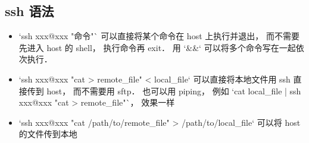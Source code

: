 \subsection{ssh 语法}
\begin{itemize}
\item `ssh xxx@xxx "命令"` 可以直接将某个命令在 host 上执行并退出， 而不需要先进入 host 的 shell， 执行命令再 exit． 用 `&&` 可以将多个命令写在一起依次执行．
\item `ssh xxx@xxx "cat > remote_file" < local_file` 可以直接将本地文件用 ssh 直接传到 host， 而不需要用 sftp． 也可以用 piping， 例如 `cat local_file | ssh xxx@xxx "cat > remote_file"`， 效果一样
\item `ssh xxx@xxx "cat /path/to/remote_file" > /path/to/local_file` 可以将 host 的文件传到本地
\end{itemize}
